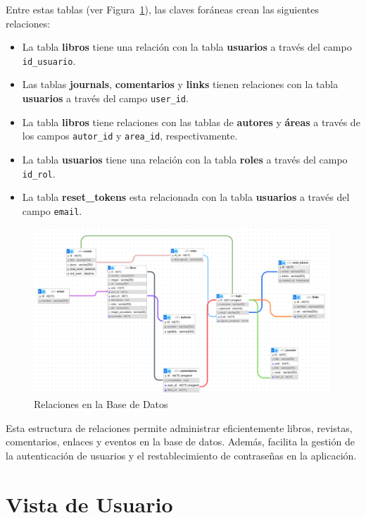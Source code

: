 \documentclass[a4paper, 12pt]{book}
\begin{document}
Entre estas tablas (ver Figura~\ref{fig:relbd}), las claves foráneas crean las siguientes relaciones:
  \begin{itemize}
  \item La tabla \textbf{libros} tiene una relación con la tabla \textbf{usuarios} a través del campo \texttt{id\_usuario}.
  \item Las tablas \textbf{journals}, \textbf{comentarios} y \textbf{links} tienen relaciones con la tabla \textbf{usuarios} a través del campo \texttt{user\_id}.
  \item La tabla \textbf{libros} tiene relaciones con las tablas de \textbf{autores} y \textbf{áreas} a través de los campos \texttt{autor\_id} y \texttt{area\_id}, respectivamente.
  \item La tabla \textbf{usuarios} tiene una relación con la tabla \textbf{roles} a través del campo \texttt{id\_rol}.
  \item La tabla \textbf{reset\_tokens} esta relacionada con la tabla \textbf{usuarios} a través del campo \texttt{email}.
  \end{itemize}

  \begin{figure}
    \centering
    \includegraphics[width=0.99\textwidth]{img/diagrmabase.png}
    \caption{Relaciones en la Base de Datos}
    \label{fig:relbd}
  \end{figure}
Esta estructura de relaciones permite administrar eficientemente libros, revistas, comentarios, enlaces y eventos en la 
base de datos. Además, facilita la gestión de la autenticación de usuarios y el restablecimiento de contraseñas en la aplicación.

\section{Vista de Usuario}
\label{sec:vista_usuarios}
\end{document}
